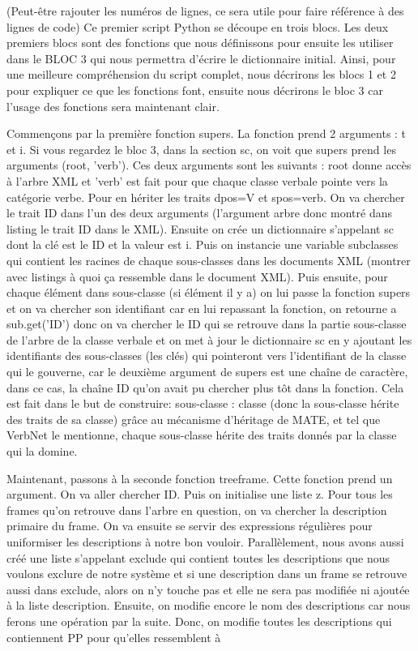 (Peut-être rajouter les numéros de lignes, ce sera utile pour faire référence à des lignes de code)
Ce premier script Python se découpe en trois blocs. Les deux premiers blocs sont des fonctions que nous définissons pour ensuite les utiliser dans le BLOC 3 qui nous permettra d'écrire le dictionnaire initial.  Ainsi, pour une meilleure compréhension du script complet, nous décrirons les blocs 1 et 2 pour expliquer ce que les fonctions font, ensuite nous décrirons le bloc 3 car l'usage des fonctions sera maintenant clair.

Commençons par la première fonction supers. La fonction prend 2 arguments : t et i. Si vous regardez le bloc 3, dans la section sc, on voit que supers prend les arguments (root, 'verb'). Ces deux arguments sont les suivants : root donne accès à l'arbre XML et 'verb' est fait pour que chaque classe verbale pointe vers la catégorie verbe. Pour en hériter les traits dpos=V et spos=verb.  On va chercher le trait ID dans l'un des deux arguments (l'argument arbre donc montré dans listing le trait ID dans le XML). Ensuite on crée un dictionnaire s'appelant sc dont la clé est le ID et la valeur est i. Puis on instancie une variable subclasses qui contient les racines de chaque sous-classes dans les documents XML (montrer avec listings à quoi ça ressemble dans le document XML). Puis ensuite, pour chaque élément dans sous-classe (si élément il y a) on lui passe la fonction supers et on va chercher son identifiant car en lui repassant la fonction, on retourne a sub.get('ID') donc on va chercher le ID qui se retrouve dans la partie sous-classe de l'arbre de la classe verbale et on met à jour le dictionnaire sc en y ajoutant les identifiants des sous-classes (les clés) qui pointeront vers l'identifiant de la classe qui le gouverne, car le deuxième argument de supers est une chaîne de caractère, dans ce cas, la chaîne ID qu'on avait pu chercher plus tôt dans la fonction. Cela est fait dans le but de construire: sous-classe : classe (donc la sous-classe hérite des traits de sa classe) grâce au mécanisme d'héritage de MATE, et tel que VerbNet le mentionne, chaque sous-classe hérite des traits donnés par la classe qui la domine. 

Maintenant, passons à la seconde fonction treeframe. Cette fonction prend un argument. On va aller chercher ID. Puis on initialise une liste z. Pour tous les frames qu'on retrouve dans l'arbre en question, on va chercher la description primaire du frame. On va ensuite se servir des expressions régulières pour uniformiser les descriptions à notre bon vouloir. Parallèlement, nous avons aussi créé une liste s'appelant exclude qui contient toutes les descriptions que nous voulons exclure de notre système et si une description dans un frame se retrouve aussi dans exclude, alors on n'y touche pas et elle ne sera pas modifiée ni ajoutée à la liste description. Ensuite, on modifie encore le nom des descriptions car nous ferons une opération par la suite. Donc, on modifie toutes les descriptions qui contiennent PP pour qu'elles ressemblent à 


